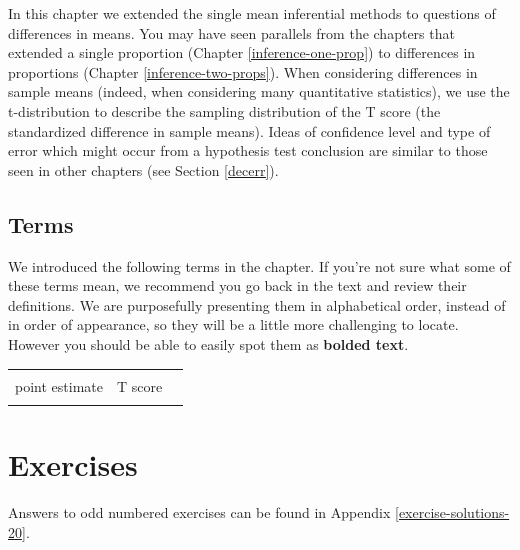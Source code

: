 \documentclass[
  10pt,
  openany]{book}
\begin{document}
In this chapter we extended the single mean inferential methods to questions of differences in means.
You may have seen parallels from the chapters that extended a single proportion (Chapter \ref{inference-one-prop}) to differences in proportions (Chapter \ref{inference-two-props}).
When considering differences in sample means (indeed, when considering many quantitative statistics), we use the t-distribution to describe the sampling distribution of the T score (the standardized difference in sample means).
Ideas of confidence level and type of error which might occur from a hypothesis test conclusion are similar to those seen in other chapters (see Section \ref{decerr}).

\hypertarget{terms-12}{%
\subsection{Terms}\label{terms-12}}

We introduced the following terms in the chapter.
If you're not sure what some of these terms mean, we recommend you go back in the text and review their definitions.
We are purposefully presenting them in alphabetical order, instead of in order of appearance, so they will be a little more challenging to locate.
However you should be able to easily spot them as \textbf{bolded text}.

\begin{tabu} to 
\toprule
{} &  & \\
point estimate & T score & \\
 &  & \\
\bottomrule
\end{tabu}

\clearpage

\hypertarget{chp20-exercises}{%
\section{Exercises}\label{chp20-exercises}}

Answers to odd numbered exercises can be found in Appendix \ref{exercise-solutions-20}.
\end{document}
